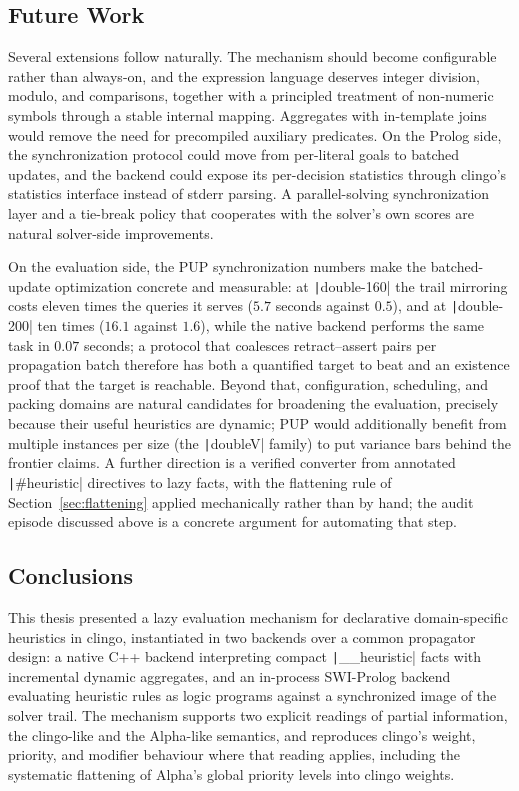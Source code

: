 \subsection{Future Work}

Several extensions follow naturally. The mechanism should become configurable rather than always-on, and the expression language deserves integer division, modulo, and comparisons, together with a principled treatment of non-numeric symbols through a stable internal mapping. Aggregates with in-template joins would remove the need for precompiled auxiliary predicates. On the Prolog side, the synchronization protocol could move from per-literal goals to batched updates, and the backend could expose its per-decision statistics through clingo's statistics interface instead of stderr parsing. A parallel-solving synchronization layer and a tie-break policy that cooperates with the solver's own scores are natural solver-side improvements.

On the evaluation side, the PUP synchronization numbers make the batched-update optimization concrete and measurable: at \texttt|double-160| the trail mirroring costs eleven times the queries it serves ($5.7$ seconds against $0.5$), and at \texttt|double-200| ten times ($16.1$ against $1.6$), while the native backend performs the same task in $0.07$ seconds; a protocol that coalesces retract--assert pairs per propagation batch therefore has both a quantified target to beat and an existence proof that the target is reachable. Beyond that, configuration, scheduling, and packing domains are natural candidates for broadening the evaluation, precisely because their useful heuristics are dynamic; PUP would additionally benefit from multiple instances per size (the \texttt|doubleV| family) to put variance bars behind the frontier claims. A further direction is a verified converter from annotated \texttt|#heuristic| directives to lazy facts, with the flattening rule of Section~\ref{sec:flattening} applied mechanically rather than by hand; the audit episode discussed above is a concrete argument for automating that step.

\subsection{Conclusions}

This thesis presented a lazy evaluation mechanism for declarative domain-specific heuristics in clingo, instantiated in two backends over a common propagator design: a native C++ backend interpreting compact \texttt|__heuristic| facts with incremental dynamic aggregates, and an in-process SWI-Prolog backend evaluating heuristic rules as logic programs against a synchronized image of the solver trail. The mechanism supports two explicit readings of partial information, the clingo-like and the Alpha-like semantics, and reproduces clingo's weight, priority, and modifier behaviour where that reading applies, including the systematic flattening of Alpha's global priority levels into clingo weights.

